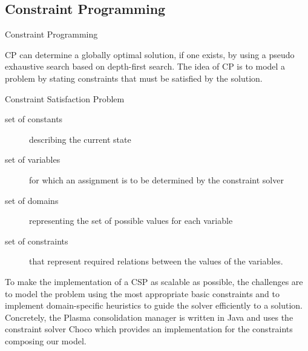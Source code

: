 \subsection{Constraint Programming} 
\begin{frame}[shrink=5]{Constraint Programming} 

CP can determine a \alert{globally optimal solution}, if one exists,
by using a pseudo exhaustive search based on depth-first search. The idea of
CP is to model a problem by stating \alert{constraints} that must be
satisfied by the solution. 
\pause{}

\begin{block}{Constraint Satisfaction Problem}
\begin{description}
\item[set of constants] describing the current state
\pause{}
\item[set of variables] for which an assignment is to be determined by the constraint solver
\pause{}
\item[set of domains] representing the set of possible values for each variable 
\pause{}
\item[set of constraints] that represent required relations between the values of the variables.

\end{description}
\end{block}

\pause{}

To make the implementation
of a CSP as scalable as possible, the challenges are to model the problem
using the most appropriate \alert{basic constraints} and to implement 
\alert{domain-specific} heuristics to guide the solver efficiently to a solution. 
\br \pause{}
Concretely, the Plasma consolidation manager is written in Java and uses the constraint
solver \alert{Choco} which provides an implementation for the constraints composing our model.


\end{frame}

